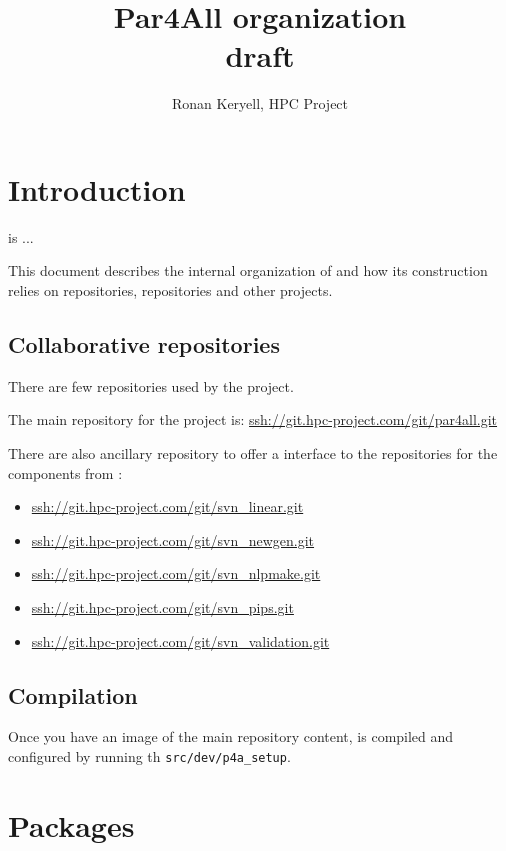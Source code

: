 \documentclass[a4paper]{article}
\begin{document}
\title{Par4All organization\\
  draft
}

\author{Ronan Keryell, HPC Project}

\maketitle

\section{Introduction}
\label{sec:introduction}

\Apfa is ...

This document describes the internal organization of \Apfa and how its
construction relies on \Agit repositories, \Asvn repositories and other
projects.


\subsection{Collaborative repositories}
\label{sec:coll-repos}

There are few \Agit repositories used by the project.

The main repository for the project is:
\url{ssh://git.hpc-project.com/git/par4all.git}

There are also ancillary \Agit repository to offer a \Agit interface to
the \Asvn repositories for the \Apips components from \Acri:
\begin{itemize}
\item \url{ssh://git.hpc-project.com/git/svn_linear.git}
\item \url{ssh://git.hpc-project.com/git/svn_newgen.git}
\item \url{ssh://git.hpc-project.com/git/svn_nlpmake.git}
\item \url{ssh://git.hpc-project.com/git/svn_pips.git}
\item \url{ssh://git.hpc-project.com/git/svn_validation.git}
\end{itemize}


\subsection{Compilation}
\label{sec:compilation}

Once you have an image of the main \Agit repository content, \Apfa is
compiled and configured by running th \verb|src/dev/p4a_setup|.


\section{Packages}
\label{sec:packages}
\end{document}
